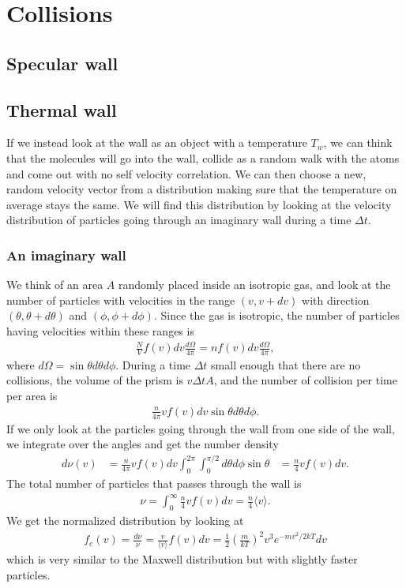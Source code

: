 \section{Collisions}
\subsection{Specular wall}
\subsection{Thermal wall}
If we instead look at the wall as an object with a temperature $T_w$, we can think that the molecules will go into the wall, collide as a random walk with the atoms and come out with no self velocity correlation. We can then choose a new, random velocity vector from a distribution making sure that the temperature on average stays the same. We will find this distribution by looking at the velocity distribution of particles going through an imaginary wall during a time $\Delta t$.
\subsubsection{An imaginary wall}
We think of an area $A$ randomly placed inside an isotropic gas, and look at the number of particles with velocities in the range $(v, v+dv)$ with direction $(\theta, \theta + d\theta)$ and $(\phi, \phi + d\phi)$. Since the gas is isotropic, the number of particles having velocities within these ranges is 
\begin{align*}
	\frac{N}{V}f(v)dv \frac{d\Omega}{4\pi} = nf(v)dv \frac{d\Omega}{4\pi},
\end{align*}
where $d\Omega=\sin\theta d\theta d\phi$. During a time $\Delta t$ small enough that there are no collisions, the volume of the prism is $v\Delta t A$, and the number of collision per time per area is 
\begin{align*}
	\frac{n}{4\pi} v f(v)dv \sin\theta d\theta d\phi.
\end{align*}
If we only look at the particles going through the wall from one side of the wall, we integrate over the angles and get the number density
\begin{align*}
	d\nu(v) &= \frac{n}{4\pi} v f(v)dv \int_0^{2\pi}\int_0^{\pi/2}d\theta d\phi \sin\theta
	&= \frac{n}{4} v f(v) dv.
\end{align*}
The total number of particles that passes through the wall is
\begin{align*}
	\nu = \int_0^\infty \frac{n}{4} v f(v) dv = \frac{n}{4} \langle v \rangle.
\end{align*}
We get the normalized distribution by looking at 
\begin{align*}
	f_e(v) = \frac{d\nu}{\nu} = \frac{v}{\langle v \rangle} f(v) dv = \frac{1}{2} \left(\frac{m}{kT}\right)^2 v^3 e^{-mv^2/2kT}dv
\end{align*}
which is very similar to the Maxwell distribution but with slightly faster particles. 